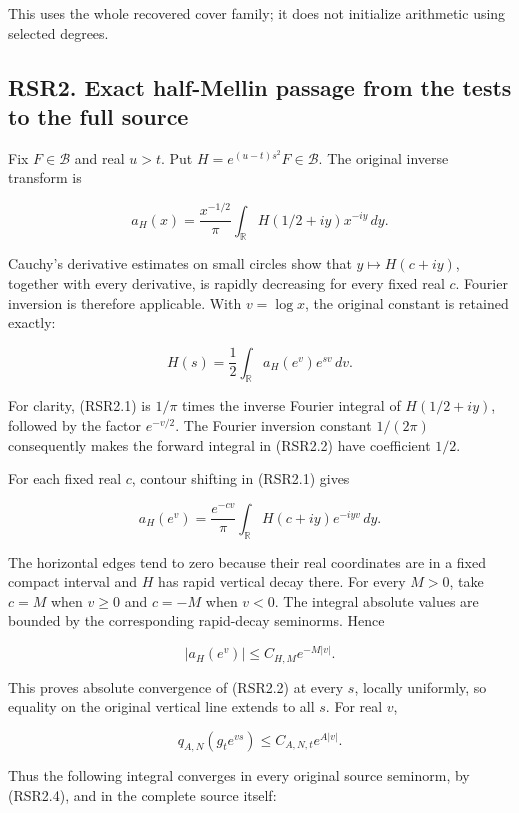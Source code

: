 This uses the whole recovered cover family; it does not initialize
arithmetic using selected degrees.

\subsection{RSR2. Exact half-Mellin passage from the tests to the full
source}\label{rsr2.-exact-half-mellin-passage-from-the-tests-to-the-full-source}

Fix \(F\in\mathcal B\) and real \(u>t\). Put
\(H=e^{(u-t)s^2}F\in\mathcal B\). The original inverse transform is

\[
a_H(x)=\frac{x^{-1/2}}\pi\int_{\mathbb R}H(1/2+iy)x^{-iy}\,dy.
\tag{RSR2.1}
\]

Cauchy's derivative estimates on small circles show that
\(y\mapsto H(c+iy)\), together with every derivative, is rapidly
decreasing for every fixed real \(c\). Fourier inversion is therefore
applicable. With \(v=\log x\), the original constant is retained
exactly:

\[
H(s)=\frac12\int_{\mathbb R}a_H(e^v)e^{sv}\,dv.
\tag{RSR2.2}
\]

For clarity, (RSR2.1) is \(1/\pi\) times the inverse Fourier integral of
\(H(1/2+iy)\), followed by the factor \(e^{-v/2}\). The Fourier
inversion constant \(1/(2\pi)\) consequently makes the forward integral
in (RSR2.2) have coefficient \(1/2\).

For each fixed real \(c\), contour shifting in (RSR2.1) gives

\[
a_H(e^v)=\frac{e^{-cv}}\pi
\int_{\mathbb R}H(c+iy)e^{-iyv}\,dy.
\tag{RSR2.3}
\]

The horizontal edges tend to zero because their real coordinates are in
a fixed compact interval and \(H\) has rapid vertical decay there. For
every \(M>0\), take \(c=M\) when \(v\ge0\) and \(c=-M\) when \(v<0\).
The integral absolute values are bounded by the corresponding
rapid-decay seminorms. Hence

\[
|a_H(e^v)|\le C_{H,M}e^{-M|v|}.
\tag{RSR2.4}
\]

This proves absolute convergence of (RSR2.2) at every \(s\), locally
uniformly, so equality on the original vertical line extends to all
\(s\). For real \(v\),

\[
q_{A,N}(g_te^{vs})\le C_{A,N,t}e^{A|v|}.
\tag{RSR2.5}
\]

Thus the following integral converges in every original source seminorm,
by (RSR2.4), and in the complete source itself:

